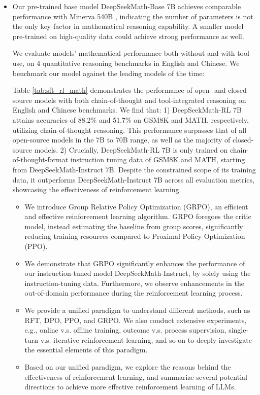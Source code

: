 \begin{itemize}[topsep=0pt]
    \item Our pre-trained base model DeepSeekMath-Base 7B achieves comparable performance with Minerva 540B \citep{minerva}, indicating the number of parameters is not the only key factor in mathematical reasoning capability. A smaller model pre-trained on high-quality data could achieve strong performance as well. 

We evaluate models' mathematical performance both without and with tool use, on 4 quantitative reasoning benchmarks in English and Chinese. We benchmark our model against the leading models of the time:

Table \ref{tab:sft_rl_math} demonstrates the performance of open- and closed-source models with both chain-of-thought and tool-integrated reasoning on English and Chinese benchmarks. We find that: 1) DeepSeekMath-RL 7B attains accuracies of 88.2\% and 51.7\% on GSM8K and MATH, respectively, utilizing chain-of-thought reasoning. This performance surpasses that of all open-source models in the 7B to 70B range, as well as the majority of closed-source models. 2) Crucially, DeepSeekMath-RL 7B is only trained on chain-of-thought-format instruction tuning data of GSM8K and MATH, starting from DeepSeekMath-Instruct 7B. Despite the constrained scope of its training data, it outperforms DeepSeekMath-Instruct 7B across all evaluation metrics, showcasing the effectiveness of reinforcement learning.

\begin{itemize}[topsep=0pt]
    \item We introduce Group Relative Policy Optimization (GRPO), an efficient and effective reinforcement learning algorithm. GRPO foregoes the critic model, instead estimating the baseline from group scores, significantly reducing training resources compared to Proximal Policy Optimization (PPO).
    \item We demonstrate that GRPO significantly enhances the performance of our instruction-tuned model DeepSeekMath-Instruct, by solely using the instruction-tuning data. Furthermore, we observe enhancements in the out-of-domain performance during the reinforcement learning process.
    \item We provide a unified paradigm to understand different methods, such as RFT, DPO, PPO, and GRPO. We also conduct extensive experiments, e.g., online v.s. offline training, outcome v.s. process supervision, single-turn v.s. iterative reinforcement learning, and so on to deeply investigate the essential elements of this paradigm.
    \item Based on our unified paradigm, we explore the reasons behind the effectiveness of reinforcement learning, and summarize several potential directions to achieve more effective reinforcement learning of LLMs.
\end{itemize}


\end{itemize}
